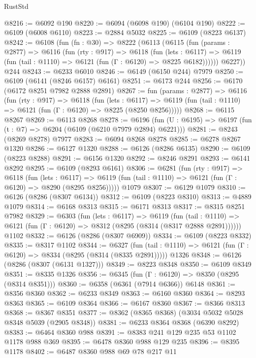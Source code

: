\begin{lexlean}{RustStd}
\begin{coremodule}
@8216 := @6092 @190
@8220 := @6094 (@6098 @190) (@6104 @190)
@8222 := @6109 (@6008 @6110)
@8223 := @2884 @5032
@8225 := @6109 (@8223 @6137)
@8242 := @6108
    (fun (fn : @30) =>
    @8222
      (@6113
        (@6115
          (fun (params : @2877) =>
          @6116
            (fun (rty : @917) =>
            @6118
              (fun (lets : @6117) =>
              @6119 (fun (tail : @1110) => @6121 (fun (Γ : @6120) => @8225 @6182))))))
        @6227))
    @244
@8243 := @6233 @6010
@8246 := @6149 (@6150 @244) @7979
@8250 := @6109 (@6141 (@8246 @6157) @6161)
@8251 := @6173 @244
@8256 := @6170 (@6172 @8251 @7982 @2888 @2891)
@8267 := fun (params : @2877) =>
  @6116
    (fun (rty : @917) =>
    @6118
      (fun (lets : @6117) =>
      @6119 (fun (tail : @1110) => @6121 (fun (Γ : @6120) => @8225 (@8250 @8256)))))
@8268 := @6115 @8267
@8269 := @6113 @8268
@8278 := @6196 (fun (U : @6195) => @6197 (fun (t : @7) => @6204 (@6109 (@6210 @7979 @2894) @6221)))
@8281 := @8243 (@8269 @8278) @7977
@8283 := @6094 @8268 @8278
@8285 := @6278 @8267 @1320
@8286 := @6127 @1320
@8288 := @6126 (@8286 @6135)
@8290 := @6109 (@8223 @8288)
@8291 := @6156 @1320
@8292 := @8246 @8291
@8293 := @6141 @8292
@8295 := @6109 (@8293 @6161)
@8306 := @6281
    (fun (rty : @917) =>
    @6118
      (fun (lets : @6117) =>
      @6119 (fun (tail : @1110) => @6121 (fun (Γ : @6120) => @8290 (@8295 @8256)))))
    @1079
@8307 := @6129 @1079
@8310 := @6126 (@8286 (@8307 @6134))
@8312 := @6109 (@8223 @8310)
@8313 := @4889 @1079
@8314 := @6168 @8313
@8315 := @6171 @8313
@8317 := @8315 @8251 @7982
@8329 := @6303
    (fun (lets : @6117) =>
    @6119
      (fun (tail : @1110) => @6121 (fun (Γ : @6120) => @8312 (@8295 (@8314 (@8317 @2888 @2891))))))
    @1102
@8332 := @6126 (@8286 (@8307 @6909))
@8334 := @6109 (@8223 @8332)
@8335 := @8317 @1102
@8344 := @6327
    (fun (tail : @1110) => @6121 (fun (Γ : @6120) => @8334 (@8295 (@8314 (@8335 @2891)))))
    @1326
@8348 := @6126 (@8286 (@8307 (@6131 @1327)))
@8349 := @8223 @8348
@8350 := @6109 @8349
@8351 := @8335 @1326
@8356 := @6345 (fun (Γ : @6120) => @8350 (@8295 (@8314 @8351)))
@8360 := @6358 (@6361 (@7914 @6366)) @6148
@8361 := @8356 @8360
@8362 := @6233 @8349
@8363 := @6160 @8360
@8364 := @8293 @8363
@8365 := @6109 @8364
@8366 := @6167 @8360
@8367 := @8366 @8313
@8368 := @8367 @8351
@8377 := @8362 (@8365 @8368) (@3034 @5032 @5028 @8348 @5039 (@2905 @8348))
@8381 := @6233 @8364 @8368 (@6390 @8292)
@8383 := @6464 @8360 @988
@8391 := @8383 @241 @129 @235 @53 @1102 @1178 @988 @369
@8395 := @6478 @8360 @988 @129 @235
@8396 := @8395 @1178
@8402 := @6487 @8360 @988 @69 @78 @217 @11

\end{coremodule}
\end{lexlean}
